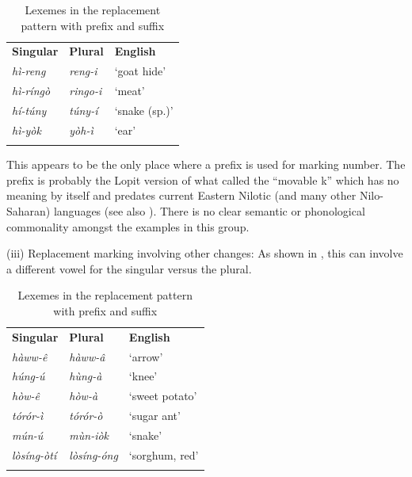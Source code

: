 \documentclass[output=paper]{langsci/langscibook}
\begin{document}
\begin{table}

\begin{tabularx}{\textwidth}{XXX}
\lsptoprule

 \textbf{Singular} & \textbf{Plural} & \textbf{English}\\
\itshape h\`{i}-reng & \itshape reng-i & ‘goat hide’\\
\itshape h\`{i}-r\'{i}ng\`{o} & \itshape ringo-i & ‘meat’\\
\itshape h\'{i}-t\'{u}ny & \itshape t\'{u}ny-\'{i} & ‘snake (sp.)’\\
\itshape h\`{i}-y\`{o}k & \itshape y\`{o}h-\`{i} & ‘ear’\\
\lspbottomrule
\end{tabularx}
\caption{Lexemes in the replacement pattern with prefix and suffix}
\label{tab:moodie:15}
\end{table}

This appears to be the only place where a prefix is used for marking number. The prefix is probably the Lopit version of what \citet{Greenberg1981} called the “movable k” which has no meaning by itself and predates current Eastern Nilotic (and many other Nilo-Saharan) languages (see also \citealt[251]{Dimmendaal1983}). There is no clear semantic or phonological commonality amongst the examples in this group.

(iii) Replacement marking involving other changes: As shown in , this can involve a different vowel for the singular versus the plural.

\begin{table}

\begin{tabularx}{\textwidth}{XXX}
\lsptoprule

 \textbf{Singular} & \textbf{Plural} & \textbf{English}\\
\itshape h\`{a}ww-\^{e} & \itshape h\`{a}ww-\^{a} & ‘arrow’\\
\itshape h\'{u}ng-\'{u} & \itshape h\`{u}ng-\`{a} & ‘knee’\\
\itshape h\`{o}w-\^{e} & \itshape h\`{o}w-\`{a} & ‘sweet potato’\\
\itshape t\'{o}r\'{o}r-\`{i} & \itshape t\'{o}r\'{o}r-\`{o} & ‘sugar ant’\\
\itshape m\'{u}n-\'{u} & \itshape m\`{u}n-i\`{o}k & ‘snake’\\
\itshape l\`{o}s\'{i}ng-\`{o}t\'{i} & \itshape l\`{o}s\'{i}ng-\'{o}ng & ‘sorghum, red’\\
\lspbottomrule
\end{tabularx}
\caption{Lexemes in the replacement pattern with prefix and suffix}
\label{tab:moodie:16}
\end{table}
\end{document}
